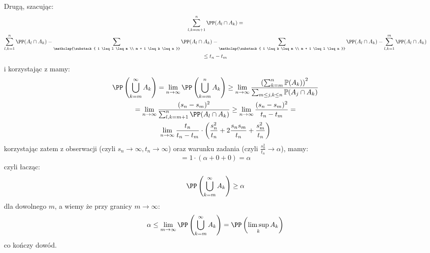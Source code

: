\documentclass[11pt]{scrartcl}
\begin{document}
    Drugą, szacując:
    \begin{gather*}
        \sum_{l,k=m+1}^{n} \PP (A_l \cap A_k) = \\
        \sum_{l,k = 1}^{n} \PP (A_l \cap A_k) -   
        \sum_{\mathclap{\substack{
                1 \leq l \leq m \\
                m + 1 \leq k \leq n
        }}} \PP (A_l \cap A_k) -
        \sum_{\mathclap{\substack{
                1 \leq k \leq m \\
                m + 1 \leq l \leq n
        }}} \PP (A_l \cap A_k) -
        \sum_{l,k=1}^{m} \PP (A_l \cap A_k)  \\
        \leq t_n - t_m
    \end{gather*}
    i korzystając z  mamy:
    \begin{gather*}
        \PP \left ( \bigcup_{k = m}^{\infty} A_k \right ) = 
        \lim_{n \to \infty} \PP \left ( \bigcup_{k = m}^{n} A_k \right ) \geq
        \lim_{n \to \infty} \frac{\left( \sum_{k=m}^{n} \mathbb{P}(A_k) \right)^2}
            {\sum_{m \leq j, k \leq n} \mathbb{P}(A_j \cap A_k)} \\
        = \lim_{n \to \infty} \frac{(s_n - s_m)^2}
            {\sum_{l,k=m+1}^{n} \PP (A_l \cap A_k)}
        \geq \lim_{n \to \infty} \frac{(s_n - s_m)^2}{t_n - t_m} = \\
        \lim_{n \to \infty } \frac{t_n}{t_n - t_m} \cdot 
            \left ( \frac{s_n^2}{t_n} + 2 \frac{s_n s_m}{t_n} + \frac{s_m^2}{t_n} \right )
    \end{gather*}
    korzystając zatem z obserwacji (czyli $s_n \to \infty, t_n \to \infty$) 
    oraz warunku zadania (czyli $\frac{s_n^2}{t_n} \to \alpha $), mamy:
    \[
        = 1 \cdot ( \alpha + 0 + 0 ) = \alpha 
    \]
    czyli łacząc:
    \[
        \PP \left ( \bigcup_{k = m}^{\infty} A_k \right ) \geq \alpha 
    \]
    dla dowolnego $m$, a wiemy że przy granicy $m \to \infty $: 
    \[
        \alpha \leq \lim_{m \to \infty} \PP \left ( \bigcup_{k = m}^{\infty} A_k \right ) = 
        \PP \left ( \limsup_k A_k \right )
    \]
    co kończy dowód.
\end{document}
